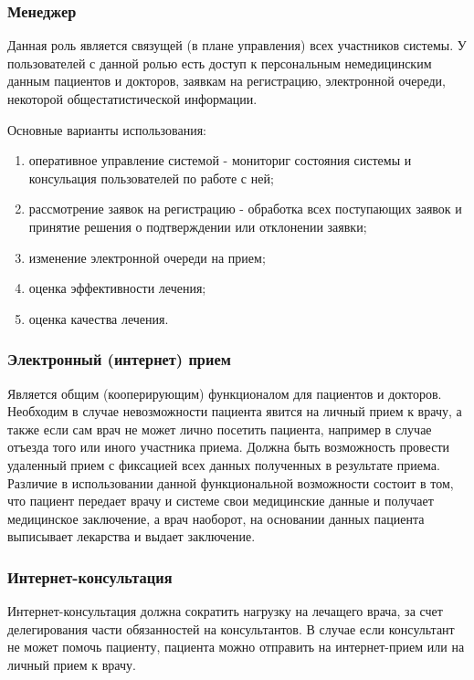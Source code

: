 \subsubsection{Менеджер}
Данная роль является связущей (в плане управления) всех участников системы. У
пользователей с данной ролью есть доступ к персональным немедицинским данным
пациентов и докторов, заявкам на регистрацию, электронной очереди, некоторой
общестатистической информации.

Основные варианты использования:

\begin{enumerate}
  \item оперативное управление системой - мониториг состояния системы и
  консульация пользователей по работе с ней;
  \item рассмотрение заявок на регистрацию - обработка всех поступающих заявок и
  принятие решения о подтверждении или отклонении заявки;
  \item изменение электронной очереди на прием;
  \item оценка эффективности лечения;
  \item оценка качества лечения.
\end{enumerate}

\subsubsection{Электронный (интернет) прием}
Является общим (кооперирующим) функционалом для пациентов и докторов. Необходим
в случае невозможности пациента явится на личный прием к врачу, а также если сам
врач не может лично посетить пациента, например в случае отъезда того или иного
участника приема. Должна быть возможность провести удаленный прием с фиксацией
всех данных полученных в результате приема. Различие в использовании данной
функциональной возможности состоит в том, что пациент передает врачу и системе
свои медицинские данные и получает медицинское заключение, а врач наоборот, на
основании данных пациента выписывает лекарства и выдает заключение.

\subsubsection{Интернет-консультация}
Интернет-консультация должна сократить нагрузку на лечащего врача, за счет
делегирования части обязанностей на консультантов. В случае если консультант не
может помочь пациенту, пациента можно отправить на интернет-прием или на личный
прием к врачу.
